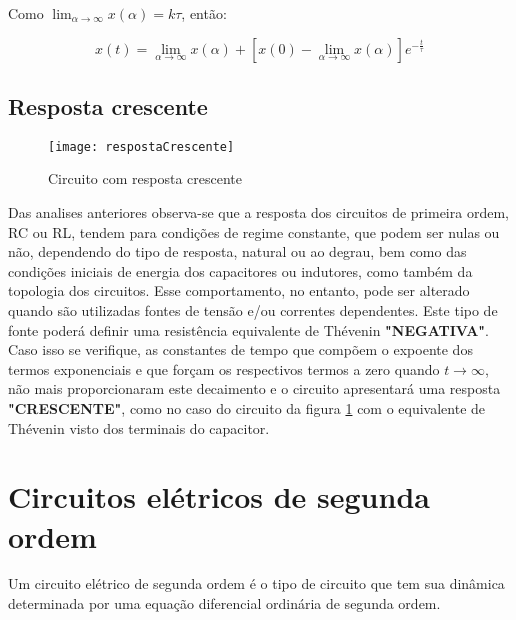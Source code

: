 \documentclass[12pt,fleqn]{book} %
\begin{document}
{Como $\lim_{\alpha\rightarrow\infty}x(\alpha)=k\tau$, então:

    \begin{equation}
    x(t)=\lim_{\alpha\rightarrow\infty}x(\alpha)+[x(0)-\lim_{\alpha\rightarrow\infty}x(\alpha)]e^{-\frac{t}{\tau}}
    \end{equation}
    
    \section{Resposta crescente}
    
\begin{figure}[!htbp] \centering\texttt{[image: respostaCrescente]}
            \caption{Circuito com resposta crescente}\label{respostaCrescente} 
        \end{figure}    
    
    Das analises anteriores observa-se que a resposta dos circuitos de primeira ordem, RC ou RL, tendem para condições de regime constante, que podem ser nulas ou não, dependendo do tipo de resposta, natural ou ao degrau, bem como das condições iniciais de energia dos capacitores ou indutores, como também da topologia dos circuitos. Esse comportamento, no entanto, pode ser alterado quando são utilizadas fontes de tensão e/ou correntes dependentes. Este tipo de fonte poderá definir uma resistência equivalente de Thévenin \textbf{"NEGATIVA"}. Caso isso se verifique, as constantes de tempo que compõem o expoente dos termos exponenciais e que forçam os respectivos termos a zero quando $t\rightarrow\infty$, não mais proporcionaram este decaimento e o circuito apresentará uma resposta \textbf{"CRESCENTE"}, como no caso do circuito da figura \ref{respostaCrescente} com o equivalente de Thévenin visto dos terminais do capacitor.  
        
     
	
\chapter{Circuitos elétricos de segunda ordem}

Um circuito elétrico de segunda ordem é o tipo de circuito que tem sua dinâmica determinada por uma equação diferencial ordinária de segunda ordem.

}
\end{document}

